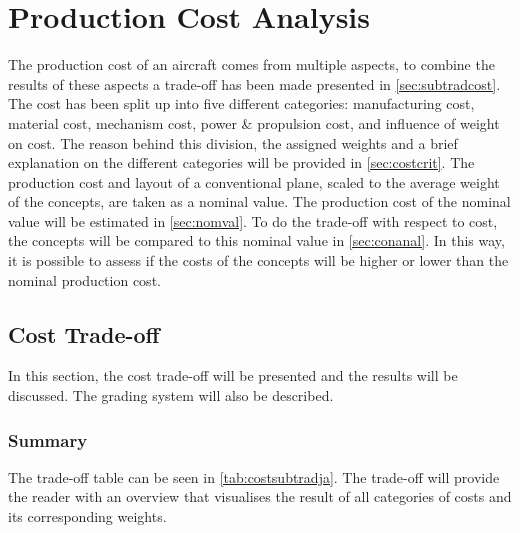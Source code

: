 \chapter{Production Cost Analysis}
\label{ch:costanal}

The production cost of an aircraft comes from multiple aspects, to combine the results of these aspects a trade-off has been made presented in \autoref{sec:subtradcost}. The cost has been split up into five different categories: manufacturing cost, material cost, mechanism cost, power \& propulsion cost, and influence of weight on cost. The reason behind this division, the assigned weights and a brief explanation on the different categories will be provided in \autoref{sec:costcrit}. The production cost and layout of a conventional plane, scaled to the average weight of the concepts, are taken as a nominal value. The production cost of the nominal value will be estimated in \autoref{sec:nomval}. To do the trade-off with respect to cost, the concepts will be compared to this nominal value in \autoref{sec:conanal}. In this way, it is possible to assess if the costs of the concepts will be higher or lower than the nominal production cost.   

\section{Cost Trade-off}
\label{sec:subtradcost}
In this section, the cost trade-off will be presented and the results will be discussed. The grading system will also be described.

\subsection{Summary}
The trade-off table can be seen in \autoref{tab:costsubtradja}. The trade-off will provide the reader with an overview that visualises the result of all categories of costs and its corresponding weights.



